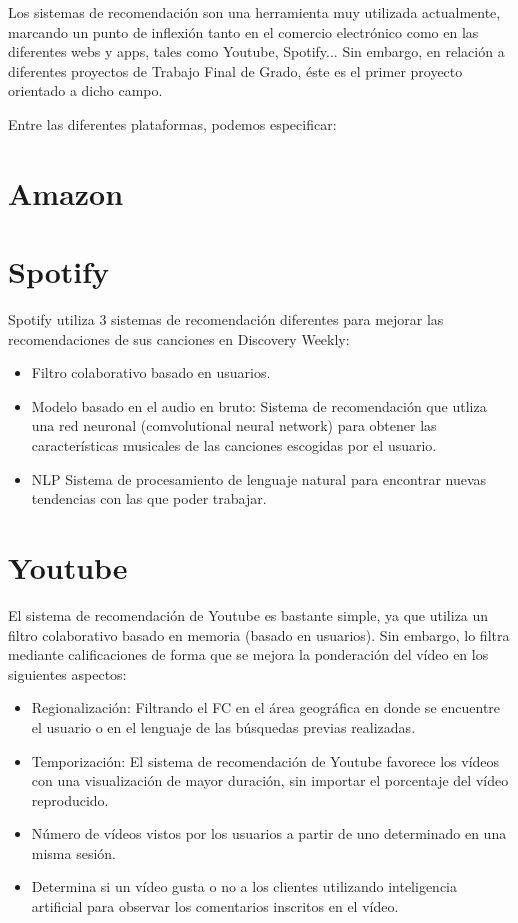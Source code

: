 Los sistemas de recomendación son una herramienta muy utilizada actualmente, marcando un punto de inflexión tanto  en el comercio electrónico   como  en las diferentes webs y apps, tales como Youtube, Spotify... 
Sin embargo, en relación a diferentes proyectos de Trabajo Final de Grado, éste es el primer proyecto orientado a dicho campo. 

Entre las diferentes plataformas, podemos especificar:

\section{Amazon}

\section{Spotify}
Spotify  utiliza 3 sistemas de recomendación diferentes para mejorar las recomendaciones de sus canciones en Discovery Weekly: 
\begin{itemize}
\item Filtro colaborativo basado en usuarios. 
\item Modelo basado en el audio en bruto: Sistema de recomendación que utliza una red neuronal (comvolutional neural network) para obtener las características musicales de las canciones escogidas por el usuario. 
\item NLP Sistema de procesamiento de lenguaje natural para encontrar nuevas tendencias con las que poder trabajar. \cite{isaac:spotify}
\end{itemize}



\section{Youtube}
El sistema de recomendación de Youtube es bastante simple, ya que utiliza un filtro colaborativo basado en memoria (basado en usuarios). Sin embargo, lo filtra mediante calificaciones de forma que se mejora la ponderación del vídeo en los siguientes aspectos: 
\begin{itemize}
\item Regionalización: Filtrando el FC en el área geográfica en donde se encuentre el usuario o  en  el lenguaje de las búsquedas previas realizadas. \nocite{md:youtube}
\item Temporización: El sistema de recomendación de Youtube favorece los vídeos con una visualización de mayor duración, sin importar el porcentaje del vídeo reproducido. \nocite{anali:youtube}
\item Número de vídeos vistos por los usuarios a partir de uno determinado en una misma sesión. \nocite{hoots:youtube}
\item Determina si un vídeo gusta o no a los clientes utilizando inteligencia artificial para observar los comentarios inscritos en el vídeo. 
\end{itemize}
